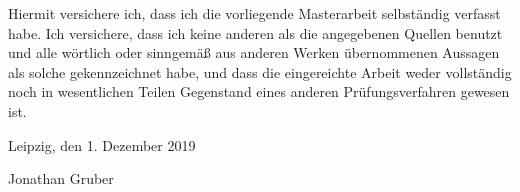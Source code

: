 \clearpage
{}

Hiermit versichere ich, dass ich die vorliegende Masterarbeit selbständig verfasst habe. Ich versichere, dass ich keine anderen als die angegebenen Quellen benutzt und alle wörtlich oder sinngemäß aus anderen Werken übernommenen Aussagen als solche gekennzeichnet habe, und dass die eingereichte Arbeit weder vollständig noch in wesentlichen Teilen Gegenstand eines anderen Prüfungsverfahren gewesen ist.

Leipzig, den 1. Dezember 2019
\vspace{0.5cm}

\makebox[4cm]{\hrulefill}
\newline\vspace{1cm}
Jonathan Gruber
